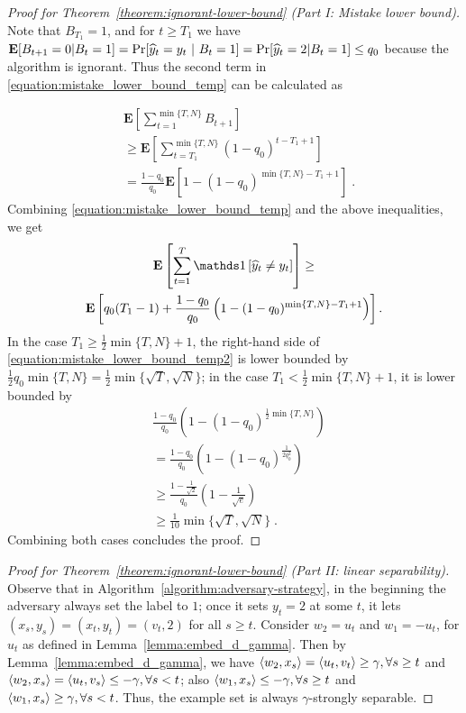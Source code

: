 \begin{proof}[Proof for Theorem~\ref{theorem:ignorant-lower-bound} (Part I: Mistake lower bound)]
Note that $B_{T_1}=1$, and for $t \ge T_1$ we have
$\operatorname*{\mathbf{E}}[B_{t+1}=0|B_t=1]=\Pr[\widehat y_t=y_t~|~B_t=1] = \Pr[\widehat y_t=2|B_t=1] \le
q_0$ because the algorithm is ignorant. Thus the second term in
\eqref{equation:mistake_lower_bound_temp} can be calculated as

\begin{align*}
& \mathbf{E}\left[\sum_{t=1}^{\min\{T,N\}}B_{t+1}\right] \\
& \ge \mathbf{E}\left[\sum_{t=T_1}^{\min\{ T,N \}} (1-q_0)^{t-T_1+1} \right] \\
& = \frac{1-q_0}{q_0}\mathbf{E}\left[1-(1-q_0)^{\min\{T,N\}-T_1+1}\right] \; .
\end{align*}
Combining \eqref{equation:mistake_lower_bound_temp} and the above inequalities, we get
\begin{multline}
\label{equation:mistake_lower_bound_temp2}
\mathbf{E} \left[\sum_{t=1}^T \indicator{\widehat y_t\neq y_t}\right] \ge
\\ \mathbf{E}\left[q_0(T_1-1)+\frac{1-q_0}{q_0}\left(1-(1-q_0)^{\min\{T,N\}-T_1+1}\right)\right].
\end{multline}
In the case $T_1\ge \frac{1}{2}\min\{T,N\}+1$, the right-hand side of
\eqref{equation:mistake_lower_bound_temp2} is lower bounded by
$\frac{1}{2}q_0\min\{T,N\}=\frac{1}{2}\min\{\sqrt{T}, \sqrt{N}\}$; in the case
$T_1< \frac{1}{2}\min\{T,N\}+1$, it is lower bounded by
\begin{align*}
& \frac{1-q_0}{q_0}\left(1-(1-q_0)^{\frac{1}{2}\min\{T,N\}}\right) \\
& = \frac{1-q_0}{q_0}\left(1-(1-q_0)^{\frac{1}{2q_0^2}}\right) \\
& \ge \frac{1-\frac{1}{\sqrt{2}}}{q_0}\left(1-\frac{1}{\sqrt{e}}\right) \\
& \ge \frac{1}{10}\min\{\sqrt{T}, \sqrt{N}\} \; .
\end{align*}
Combining both cases concludes the proof.
\end{proof}

\begin{proof}[Proof for Theorem~\ref{theorem:ignorant-lower-bound} (Part II: linear separability)]
Observe that in Algorithm~\ref{algorithm:adversary-strategy}, in the beginning
the adversary always set the label to $1$; once it sets $y_t=2$ at some $t$, it
lets $(x_s, y_s)=(x_t, y_t)=(v_t, 2)$ for all $s\ge t$. Consider $w_2=u_t$ and
$w_1=-u_t$, for $u_t$ as defined in Lemma~\ref{lemma:embed_d_gamma}. Then by
Lemma~\ref{lemma:embed_d_gamma}, we have $\left\langle w_2, x_s \right\rangle = \left\langle u_t, v_t \right\rangle \ge
\gamma, \forall s \ge t$ and $\left\langle w_2, x_s \right\rangle = \left\langle u_t, v_s \right\rangle \le - \gamma,
\forall s< t$; also $\left\langle w_1, x_s \right\rangle \le -\gamma, \forall s \ge t$ and
$\left\langle w_1, x_s \right\rangle \ge  \gamma, \forall s<t$. Thus, the example set is always
$\gamma$-strongly separable.
\end{proof}
